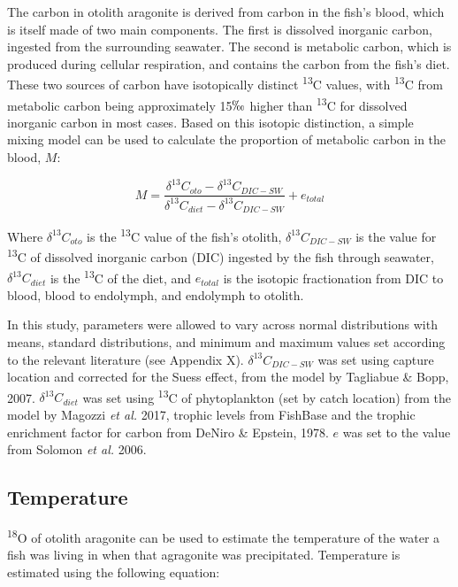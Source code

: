 \documentclass[12pt, titlepage]{article}
\begin{document}
The carbon in otolith aragonite is derived from carbon in the fish's blood, which is itself made of two main components. The first is dissolved inorganic carbon, ingested from the surrounding seawater. 
The second is metabolic carbon, which is produced during cellular respiration, and contains the carbon from the fish's diet. 
These two sources of carbon have isotopically distinct \textdelta \textsuperscript{13}C values, with \textdelta \textsuperscript{13}C from metabolic carbon being approximately 15$\permil$ higher than \textdelta \textsuperscript{13}C for dissolved inorganic carbon in most cases. %
Based on this isotopic distinction, a simple mixing model can be used to calculate the proportion of metabolic carbon in the blood, $M$:

\begin{equation}
M = \frac{\delta^{13}C_{oto}-\delta^{13}C_{DIC-SW}}{\delta^{13}C_{diet}-\delta^{13}C_{DIC-SW}} + e_{total}
\end{equation}

\noindent Where $\delta^{13}C_{oto}$ is the \textdelta \textsuperscript{13}C value of the fish's otolith, $\delta^{13}C_{DIC-SW}$ is the value for \textdelta \textsuperscript{13}C of dissolved inorganic carbon (DIC) ingested by the fish through seawater, $\delta^{13}C_{diet}$ is the \textdelta \textsuperscript{13}C of the diet, and $e_{total}$ is the isotopic fractionation from DIC to blood, blood to endolymph, and endolymph to otolith.

In this study, parameters were allowed to vary across normal distributions with means, standard distributions, and minimum and maximum values set according to the relevant literature (see Appendix X). %
$\delta^{13}C_{DIC-SW}$ was set using capture location and corrected for the Suess effect, from the model by Tagliabue \& Bopp, 2007.
$\delta^{13}C_{diet}$ was set using \textdelta \textsuperscript{13}C of phytoplankton (set by catch location) from the model by Magozzi \textit{et al.} 2017, trophic levels from FishBase and the trophic enrichment factor for carbon from DeNiro \& Epstein, 1978.
$e$ was set to the value from Solomon \textit{et al.} 2006.

\subsection{Temperature}

\textdelta \textsuperscript{18}O of otolith aragonite can be used to estimate the temperature of the water a fish was living in when that agragonite was precipitated. %
Temperature is estimated using the following equation:
\end{document}
